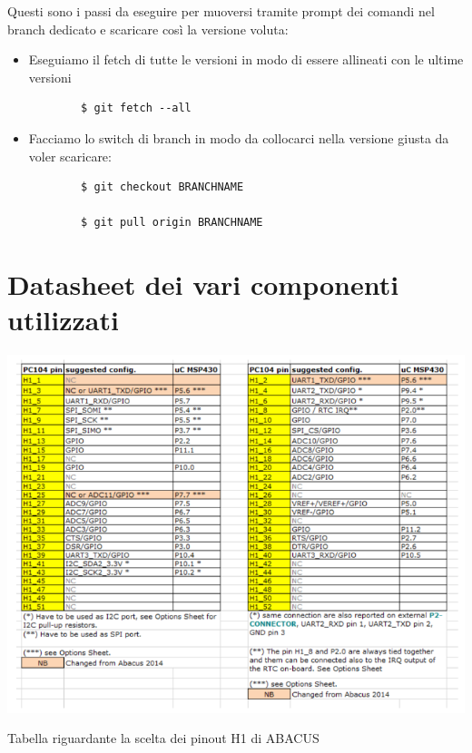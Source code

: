 \documentclass[LaM,binding=0.6cm,oneside]{../sapthesis}
\begin{document}
Questi sono i passi da eseguire per muoversi tramite prompt dei comandi nel branch dedicato e scaricare così la versione voluta:

\begin{itemize}
    \item Eseguiamo il fetch di tutte le versioni in modo di essere allineati con le ultime versioni

    \begin{verbatim}
        $ git fetch --all
    \end{verbatim}

     \item Facciamo lo switch di branch in modo da collocarci nella versione giusta da voler scaricare:
     
    \begin{verbatim}
        $ git checkout BRANCHNAME
        
        $ git pull origin BRANCHNAME
    \end{verbatim}
     
\end{itemize}

\chapter{Datasheet dei vari componenti utilizzati}

    \begin{table}[htbp]
    \centerline{\includegraphics[scale=.85]{examples/datasheet/abacusDatasheet7.PNG}}
    \caption{Tabella riguardante la scelta dei pinout H1 di ABACUS}
    \label{fig}
    \end{table}
    
\end{document}
